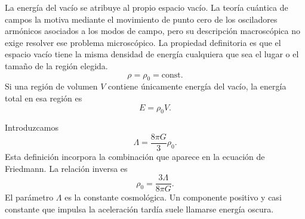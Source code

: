 La energía del vacío se atribuye al propio espacio vacío. La teoría cuántica de campos la motiva mediante el movimiento de punto cero de los osciladores armónicos asociados a los modos de campo, pero su descripción macroscópica no exige resolver ese problema microscópico. La propiedad definitoria es que el espacio vacío tiene la misma densidad de energía cualquiera que sea el lugar o el tamaño de la región elegida.
\begin{equation}
\rho=\rho_0=\text{const.}
\label{eq:c05-vacuum-density}
\end{equation}
Si una región de volumen \(V\) contiene únicamente energía del vacío, la energía total en esa región es
\begin{equation}
E=\rho_0 V.
\end{equation}
\begin{classroomqa}
\end{classroomqa}

Introduzcamos
\begin{equation}
\Lambda=\frac{8\pi G}{3}\rho_0.
\label{eq:c05-lambda-definition}
\end{equation}
Esta definición incorpora la combinación que aparece en la ecuación de Friedmann. La relación inversa es
\begin{equation}
\rho_0=\frac{3\Lambda}{8\pi G}.
\end{equation}
El parámetro \(\Lambda\) es la constante cosmológica. Un componente positivo y casi constante que impulsa la aceleración tardía suele llamarse energía oscura.

